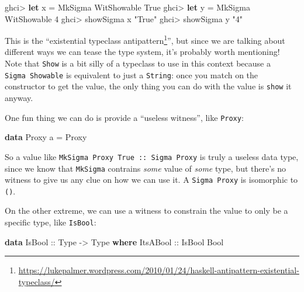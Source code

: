 \documentclass[]{article}
\newenvironment{Shaded}{}{}
\newcommand{\DataTypeTok}[1]{\textcolor[rgb]{0.56,0.13,0.00}{#1}}
\newcommand{\DecValTok}[1]{\textcolor[rgb]{0.25,0.63,0.44}{#1}}
\newcommand{\KeywordTok}[1]{\textcolor[rgb]{0.00,0.44,0.13}{\textbf{#1}}}
\newcommand{\NormalTok}[1]{#1}
\newcommand{\OperatorTok}[1]{\textcolor[rgb]{0.40,0.40,0.40}{#1}}
\newcommand{\OtherTok}[1]{\textcolor[rgb]{0.00,0.44,0.13}{#1}}
\newcommand{\StringTok}[1]{\textcolor[rgb]{0.25,0.44,0.63}{#1}}
\renewcommand{\href}[2]{#2\footnote{\url{#1}}}
\begin{document}
\begin{Shaded}
\begin{Highlighting}[]
\NormalTok{ghci}\OperatorTok{>} \KeywordTok{let}\NormalTok{ x }\OtherTok{=} \DataTypeTok{MkSigma} \DataTypeTok{WitShowable} \DataTypeTok{True}
\NormalTok{ghci}\OperatorTok{>} \KeywordTok{let}\NormalTok{ y }\OtherTok{=} \DataTypeTok{MkSigma} \DataTypeTok{WitShowable} \DecValTok{4}
\NormalTok{ghci}\OperatorTok{>}\NormalTok{ showSigma x}
\StringTok{"True"}
\NormalTok{ghci}\OperatorTok{>}\NormalTok{ showSigma y}
\StringTok{"4"}
\end{Highlighting}
\end{Shaded}

This is the
``\href{https://lukepalmer.wordpress.com/2010/01/24/haskell-antipattern-existential-typeclass/}{existential
typeclass antipattern}'', but since we are talking about different ways we can
tease the type system, it's probably worth mentioning! Note that \texttt{Show}
is a bit silly of a typeclass to use in this context because a
\texttt{Sigma\ Showable} is equivalent to just a \texttt{String}: once you match
on the constructor to get the value, the only thing you can do with the value is
\texttt{show} it anyway.

One fun thing we can do is provide a ``useless witness'', like \texttt{Proxy}:

\begin{Shaded}
\begin{Highlighting}[]
\KeywordTok{data} \DataTypeTok{Proxy}\NormalTok{ a }\OtherTok{=} \DataTypeTok{Proxy}
\end{Highlighting}
\end{Shaded}

So a value like \texttt{MkSigma\ Proxy\ True\ ::\ Sigma\ Proxy} is truly a
useless data type, since we know that \texttt{MkSigma} contrains \emph{some}
value of \emph{some} type, but there's no witness to give us any clue on how we
can use it. A \texttt{Sigma\ Proxy} is isomorphic to \texttt{()}.

On the other extreme, we can use a witness to constrain the value to only be a
specific type, like \texttt{IsBool}:

\begin{Shaded}
\begin{Highlighting}[]
\KeywordTok{data} \DataTypeTok{IsBool}\OtherTok{ ::} \DataTypeTok{Type} \OtherTok{{-}>} \DataTypeTok{Type} \KeywordTok{where}
    \DataTypeTok{ItsABool}\OtherTok{ ::} \DataTypeTok{IsBool} \DataTypeTok{Bool}
\end{Highlighting}
\end{Shaded}
\end{document}
